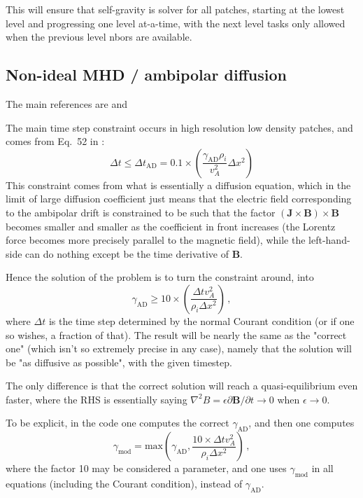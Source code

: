 \documentclass[paper=a4,fontsize=11pt]{scrartcl}
\numberwithin{equation}{section}		%
\numberwithin{figure}{section}			%
\numberwithin{table}{section}				%
\begin{document}
This will ensure that self-gravity is solver for all patches, starting at the lowest level and progressing one level at-a-time, with the next level tasks only allowed when the previous level nbors are available.

\subsection{Non-ideal MHD / ambipolar diffusion}

The main references are \cite{Masson+12} and \cite{Nakamura+Li08}

The main time step constraint occurs in high resolution low density patches, and comes from Eq.\ 52 in \cite{Masson+12}:
\def\AD{\mathrm{AD}}
\def\dtAD{\Delta t_\AD}
\def\dt{\Delta t}
\def\JJ{\mathbf{J}}
\def\BB{\mathbf{B}}
\begin{equation}
    \dt \leq \dtAD = 0.1 \times 
    \left(\frac{\gamma_{\AD} \rho_i}{v_A^2    } \Delta x^2 \right)
\end{equation}
This constraint comes from what is essentially a diffusion equation, which in the limit of large diffusion coefficient just means that the electric field corresponding to the ambipolar drift is constrained to be such that the factor $(\JJ\times\BB)\times\BB$ becomes smaller and smaller as the coefficient in front increases (the Lorentz force becomes more precisely parallel to the magnetic field), while the left-hand-side can do nothing except be the time derivative of $\BB$.

Hence the solution of the problem is to turn the constraint around, into
\def\gAD{\gamma_\AD}
\begin{equation}
    \gAD \geq 10 \times 
    \left(\frac{\dt v_A^2}{\rho_i \Delta x^2}  \right) \,,
\end{equation}
where $\dt$ is the time step determined by the normal Courant condition (or if one so wishes, a fraction of that).  The result will be nearly the same as the "correct one" (which isn't so extremely precise in any case), namely that the solution will be "as diffusive as possible", with the given timestep.

The only difference is that the correct solution will reach a quasi-equilibrium even faster, where the RHS is essentially saying $\nabla^2 B = \epsilon \partial \BB/\partial t \rightarrow 0$ when $\epsilon \rightarrow 0$.

To be explicit, in the code one computes the correct $\gAD$, and then one computes
\def\gmod{\gamma_\mathrm{mod}}
\begin{equation}\label{eq:gamAD}
    \gmod = \mathrm{max}\left(\gAD,  
    \frac{10 \times\dt v_A^2}{\rho_i \Delta x^2}  \right) \,,
\end{equation}
where the factor 10 may be considered a parameter, and one uses $\gmod$ in all equations (including the Courant condition), instead of $\gAD$.
\end{document}
